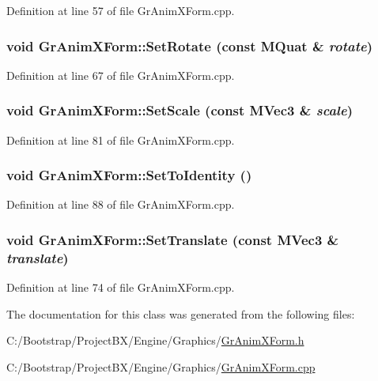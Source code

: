 Definition at line 57 of file GrAnimXForm.cpp.\hypertarget{class_gr_anim_x_form_0d25495d0795fedc1c50485fa3cbfb97}{
\subsubsection[{SetRotate}]{\setlength{\rightskip}{0pt plus 5cm}void GrAnimXForm::SetRotate (const {\bf MQuat} \& {\em rotate})}}
\label{class_gr_anim_x_form_0d25495d0795fedc1c50485fa3cbfb97}




Definition at line 67 of file GrAnimXForm.cpp.\hypertarget{class_gr_anim_x_form_034e1b305eeb463ce6714e4b6f8691d0}{
\subsubsection[{SetScale}]{\setlength{\rightskip}{0pt plus 5cm}void GrAnimXForm::SetScale (const {\bf MVec3} \& {\em scale})}}
\label{class_gr_anim_x_form_034e1b305eeb463ce6714e4b6f8691d0}




Definition at line 81 of file GrAnimXForm.cpp.\hypertarget{class_gr_anim_x_form_0dd8f0c7cb5f5ba02bb03d66559e3509}{
\subsubsection[{SetToIdentity}]{\setlength{\rightskip}{0pt plus 5cm}void GrAnimXForm::SetToIdentity ()}}
\label{class_gr_anim_x_form_0dd8f0c7cb5f5ba02bb03d66559e3509}




Definition at line 88 of file GrAnimXForm.cpp.\hypertarget{class_gr_anim_x_form_3940fe69794daeed09ff09ebd8716b49}{
\subsubsection[{SetTranslate}]{\setlength{\rightskip}{0pt plus 5cm}void GrAnimXForm::SetTranslate (const {\bf MVec3} \& {\em translate})}}
\label{class_gr_anim_x_form_3940fe69794daeed09ff09ebd8716b49}




Definition at line 74 of file GrAnimXForm.cpp.

The documentation for this class was generated from the following files:\begin{CompactItemize}
\item 
C:/Bootstrap/ProjectBX/Engine/Graphics/\hyperlink{_gr_anim_x_form_8h}{GrAnimXForm.h}\item 
C:/Bootstrap/ProjectBX/Engine/Graphics/\hyperlink{_gr_anim_x_form_8cpp}{GrAnimXForm.cpp}\end{CompactItemize}
